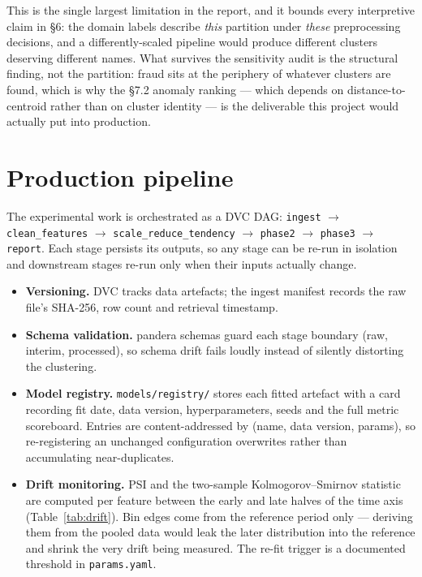 \documentclass[11pt, a4paper]{article}
\begin{document}
This is the single largest limitation in the report, and it bounds every
interpretive claim in §6: the domain labels describe \emph{this} partition under
\emph{these} preprocessing decisions, and a differently-scaled pipeline would
produce different clusters deserving different names. What survives the
sensitivity audit is the structural finding, not the partition: fraud sits at the
periphery of whatever clusters are found, which is why the §7.2 anomaly ranking
--- which depends on distance-to-centroid rather than on cluster identity --- is
the deliverable this project would actually put into production.

\section{Production pipeline}

The experimental work is orchestrated as a DVC DAG:
\texttt{ingest} $\rightarrow$ \texttt{clean\_features} $\rightarrow$
\texttt{scale\_reduce\_tendency} $\rightarrow$ \texttt{phase2} $\rightarrow$
\texttt{phase3} $\rightarrow$ \texttt{report}. Each stage persists its outputs,
so any stage can be re-run in isolation and downstream stages re-run only when
their inputs actually change.

\begin{itemize}
  \item \textbf{Versioning.} DVC tracks data artefacts; the ingest manifest
        records the raw file's SHA-256, row count and retrieval timestamp.
  \item \textbf{Schema validation.} pandera schemas guard each stage boundary
        (raw, interim, processed), so schema drift fails loudly instead of
        silently distorting the clustering.
  \item \textbf{Model registry.} \texttt{models/registry/} stores each fitted
        artefact with a card recording fit date, data version, hyperparameters,
        seeds and the full metric scoreboard. Entries are content-addressed by
        (name, data version, params), so re-registering an unchanged
        configuration overwrites rather than accumulating near-duplicates.
  \item \textbf{Drift monitoring.} PSI and the two-sample Kolmogorov--Smirnov
        statistic are computed per feature between the early and late halves of
        the time axis (Table~\ref{tab:drift}). Bin edges come from the reference
        period only --- deriving them from the pooled data would leak the later
        distribution into the reference and shrink the very drift being measured.
        The re-fit trigger is a documented threshold in \texttt{params.yaml}.
\end{itemize}
\end{document}
